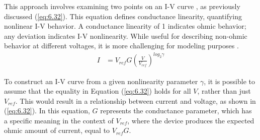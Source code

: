 
\noindent This approach involves examining two points on an I-V curve \cite{lentz2013current}, as previously discussed (\ref{eq:6.32}). This equation defines conductance linearity, quantifying nonlinear I-V behavior. A conductance linearity of 1 indicates ohmic behavior; any deviation indicates I-V nonlinearity. While useful for describing non-ohmic behavior at different voltages, it is more challenging for modeling purposes \cite{sung2018effect}.
\begin{align}
I & = V_{ref}G\left ( \frac{V}{V_{ref}} \right )^{log_2 \gamma} \label{eq:6.36}
\end{align}


\noindent To construct an I-V curve from a given nonlinearity parameter $\gamma$, it is possible to assume that the equality in Equation (\ref{eq:6.32}) holds for all $V$, rather than just $V_{ref}$. This would result in a relationship between current and voltage, as shown in (\ref{eq:6.32}). In this equation, $G$ represents the conductance parameter, which has a specific meaning in the context of $V_{ref}$, where the device produces the expected ohmic amount of current, equal to $V_{ref} G$.

